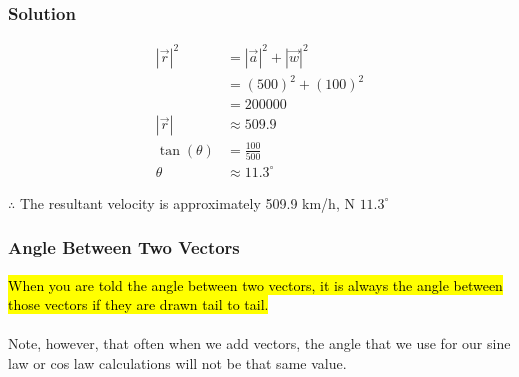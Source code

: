 \documentclass{article}
\begin{document}
\subsubsection*{Solution}
\begin{minipage}{0.45\textwidth}
    \centering
    \label{fig:my_label}
\end{minipage}%
\begin{minipage}{0.45\textwidth}
    \begin{align*}
        |\vec{r}|^2 &= |\vec{a}|^2 + |\vec{w}|^2 \\
                    &= (500)^2 + (100)^2 \\
                    &= 200000 \\
        |\vec{r}| &\approx 509.9 \\
        \tan (\theta) &= \frac{100}{500} \\
        \theta &\approx 11.3^{\circ}
    \end{align*}
\end{minipage}
\vspace{2em}

    $\therefore$ The resultant velocity is approximately 509.9 km/h, N $11.3^{\circ}$

\subsubsection{Angle Between Two Vectors}
\hl{When you are told the angle between two vectors, it is always the angle between those vectors if they are drawn tail to tail.}
\\ \\ 
Note, however, that often when we add vectors, the angle that we use for our sine law or cos law calculations will not be that same value.
\end{document}
